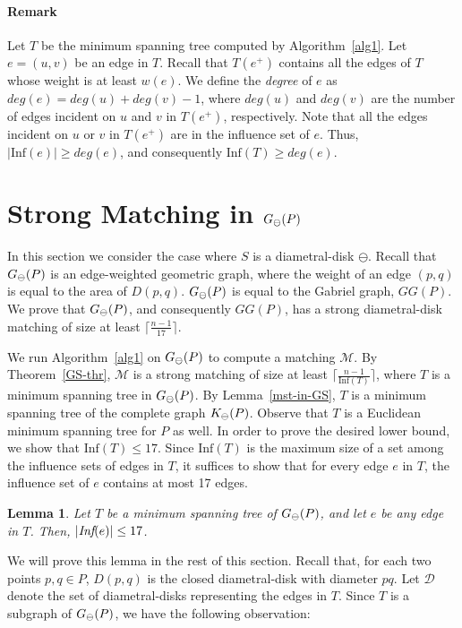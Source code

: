 \documentclass[11pt,a4paper]{article}
\newcommand{\dg}[1]{deg(#1)}
\newcommand{\G}[2]{G_{#1}({#2})}
\newcommand{\Inf}[1]{\text{Inf}(#1)}
\newcommand{\ddisc}{\ominus}
\newcommand{\ddiscs}{\scriptsize \ominus}
\newtheorem{lemma}{Lemma}
\begin{document}
\paragraph{Remark}
Let $T$ be the minimum spanning tree computed by Algorithm~\ref{alg1}. Let $e=(u,v)$ be an edge in $T$. Recall that $T(e^+)$ contains all the edges of $T$ whose weight is at least $w(e)$. We define the {\em degree} of $e$ as $\dg{e}=\dg{u}+\dg{v}-1$, where $\dg{u}$ and $\dg{v}$ are the number of edges incident on $u$ and $v$ in $T(e^+)$, respectively. Note that all the edges incident on $u$ or $v$ in $T(e^+)$ are in the influence set of $e$. Thus, $|\Inf{e}|\ge \dg{e}$, and consequently $\Inf{T}\ge \dg{e}$.

\section{Strong Matching in $\G{\ddiscs}{P}$}
\label{Gabriel-section}
In this section we consider the case where $S$ is a diametral-disk $\ddisc$. Recall that $\G{\ddiscs}{P}$ is an edge-weighted geometric graph, where the weight of an edge $(p,q)$ is equal to the area of $D(p,q)$. $\G{\ddiscs}{P}$ is equal to the Gabriel graph, $GG(P)$. We prove that $\G{\ddiscs}{P}$, and consequently $GG(P)$, has a strong diametral-disk matching of size at least $\lceil\frac{n-1}{17}\rceil$. 

We run Algorithm~\ref{alg1} on $\G{\ddiscs}{P}$ to compute a matching $\mathcal{M}$. By Theorem~\ref{GS-thr}, $\mathcal{M}$ is a strong matching of size at least $\lceil\frac{n-1}{\Inf{T}}\rceil$, where $T$ is a minimum spanning tree in $\G{\ddiscs}{P}$. By Lemma~\ref{mst-in-GS}, $T$ is a minimum spanning tree of the complete graph $K_{\ddiscs}(P)$. Observe that $T$ is a Euclidean minimum spanning tree for $P$ as well. In order to prove the desired lower bound, we show that $\Inf{T}\le 17$. Since $\Inf{T}$ is the maximum size of a set among the
influence sets of edges in $T$, it suffices to show that for every edge $e$ in $T$, the influence set of $e$ contains at most 17 edges. 
\begin{lemma}
\label{disk-inf-lemma}
Let $T$ be a minimum spanning tree of $\G{\ddiscs}{P}$, and let $e$ be any edge in $T$. Then, $|\emph{Inf}(e)|\le 17$.
\end{lemma}
We will prove this lemma in the rest of this section. Recall that, for each two points $p,q\in P$, $D(p,q)$ is the closed diametral-disk with diameter $pq$. Let $\mathcal{D}$ denote the set of diametral-disks representing the edges in $T$. Since $T$ is a subgraph of $\G{\ddiscs}{P}$, we have the following observation:
\end{document}
